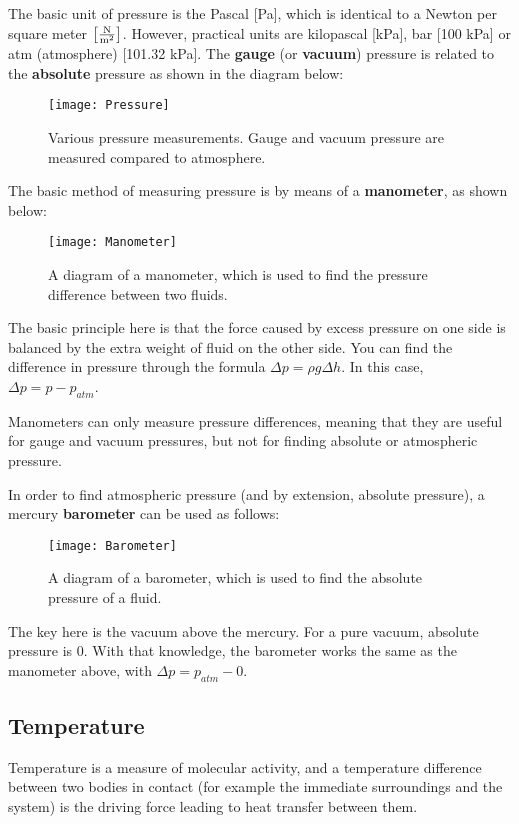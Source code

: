 The basic unit of pressure is the Pascal [Pa], which is identical to a Newton per square meter $\left[\frac{\rm N}{\rm m^2}\right]$.  However, practical units are kilopascal [kPa], bar [100 kPa] or atm (atmosphere) [101.32 kPa]. The {\bf gauge} (or {\bf vacuum}) pressure is related to the {\bf absolute} pressure as shown in the diagram below:

\begin{figure}[H]
\centering
\texttt{[image: Pressure]}
\caption{Various pressure measurements.  Gauge and vacuum pressure are measured compared to atmosphere.}
\label{fig:ch1_pressure}
\end{figure}

The basic method of measuring pressure is by means of a {\bf manometer}, as shown below:

\begin{figure}[H]
\centering
\texttt{[image: Manometer]}
\caption{A diagram of a manometer, which is used to find the pressure difference between two fluids.}
\label{fig:ch1_manometer}
\end{figure}

The basic principle here is that the force caused by excess pressure on one side is balanced by the extra weight of fluid on the other side.  You can find the difference in pressure through the formula $\Delta p = \rho g \Delta h$.  In this case, $\Delta p = p - p_{atm}$.

Manometers can only measure pressure differences, meaning that they are useful for gauge and vacuum pressures, but not for finding absolute or atmospheric pressure.

In order to find atmospheric pressure (and by extension, absolute pressure), a mercury {\bf barometer} can be used as follows:

\begin{figure}[H]
\centering
\texttt{[image: Barometer]}
\caption{A diagram of a barometer, which is used to find the absolute pressure of a fluid.}
\label{fig:ch1_barometer}
\end{figure}

The key here is the vacuum above the mercury.  For a pure vacuum, absolute pressure is 0.  With that knowledge, the barometer works the same as the manometer above, with $\Delta p = p_{atm} - 0$.

\subsection{Temperature}
Temperature is a measure of molecular activity, and a temperature difference between two bodies in contact (for example the immediate surroundings and the system) is the driving force leading to heat transfer between them.

